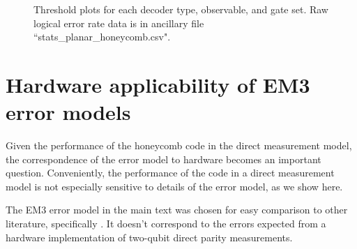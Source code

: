 \documentclass[onecolumn,a4paper,accepted=2022-09-12]{quantumarticle}
\theoremstyle{definition}
\theoremstyle{definition}
\theoremstyle{definition}
\begin{document}
\begin{figure}
    \centering
    \caption{
        Threshold plots for each decoder type, observable, and gate set.
        Raw logical error rate data is in ancillary file ``stats\_planar\_honeycomb.csv".
    }
    \label{fig:threshold_breakdown}
\end{figure}

\clearpage
\section{Hardware applicability of EM3 error models}
\label{app:hardware_em3}


Given the performance of the honeycomb code in the direct measurement model, the correspondence of the error model to hardware becomes an important question. Conveniently, the performance of the code in a direct measurement model is not especially sensitive to details of the error model, as we show here.

The EM3 error model in the main text was chosen for easy comparison to other literature, specifically \cite{chao2020optimization}. It doesn't correspond to the errors expected from a hardware implementation of two-qubit direct parity measurements. 
\end{document}
